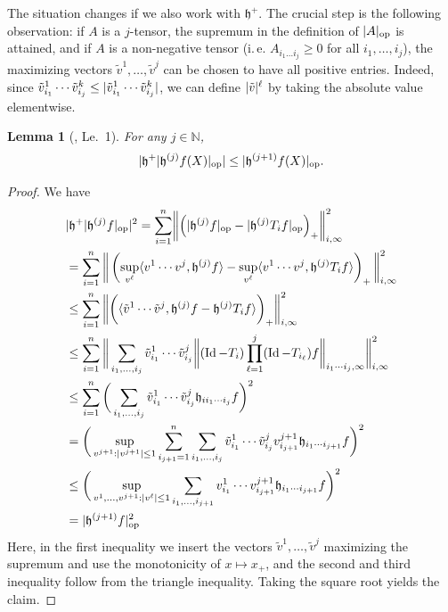 \documentclass[a4paper,12pt]{amsart}
\numberwithin{equation}{section}
\newtheorem{lemma}[satz]{Lemma}
\theoremstyle{remark}
\DeclarePairedDelimiter	{\abs}		{\lvert}	{\rvert}
\DeclarePairedDelimiter	{\norm}		{\lVert}	{\rVert}
\DeclarePairedDelimiter	{\skal}		{\langle}	{\rangle}
\DeclareMathOperator	{\Id}		{Id}
\newcommand				{\bnorm}[1]	{\bigg\lVert #1 \bigg\rVert}
\def\N{{\mathbb N}}
\begin{document}
The situation changes if we also work with $\mathfrak{h}^+$. The crucial step is the following observation: if $A$ is a $j$-tensor, the supremum in the definition of $\abs{A}_\mathrm{op}$ is attained, and if $A$ is a non-negative tensor (i.\,e. $A_{i_1 \ldots i_j} \ge 0$ for all $i_1, \ldots, i_j$), the maximizing vectors $\tilde{v}^1, \ldots, \tilde{v}^j$ can be chosen to have all positive entries. Indeed, since $\tilde{v}^1_{i_1} \cdots \tilde{v}^k_{i_j} \le \abs{\tilde{v}^1_{i_1} \cdots \tilde{v}^k_{i_j}}$, we can define $\abs{\tilde{v}}^\ell$ by taking the absolute value elementwise.

\begin{lemma}[\cite{GSS21a}, Le.\ 1]		\label{lem:recursiveEstimateOperatorNorms}
	For any $j \in \N$,
	\[
	\abs{\mathfrak{h}^+ \abs{\mathfrak{h}^{(j)} f(X)}_\mathrm{op}} \le \abs{\mathfrak{h}^{(j+1)} f(X)}_\mathrm{op}.
	\]
\end{lemma}

\begin{proof}
	We have
	\begin{align*}
		&\abs{\mathfrak{h}^+ \abs{\mathfrak{h}^{(j)} f}_\mathrm{op}}^2 = \sum_{i= 1}^n \norm*{\left( \abs{\mathfrak{h}^{(j)} f}_\mathrm{op} - \abs{\mathfrak{h}^{(j)} T_i f}_\mathrm{op} \right)_+}_{i,\infty}^2 \\
		&= \sum_{i=1}^n \bnorm{\left( \sup_{v^\ell} \skal{v^1 \cdots v^j, \mathfrak{h}^{(j)}f} - \sup_{v^\ell} \skal{v^1 \cdots v^j, \mathfrak{h}^{(j)}T_i f} \right)_+}_{i,\infty}^2 \\
		&\le \sum_{i = 1}^n \bnorm{\bigg(\skal{\tilde{v}^1\cdots \tilde{v}^j, \mathfrak{h}^{(j)}f - \mathfrak{h}^{(j)} T_i f} \bigg)_+}_{i,\infty}^2 \\
		&\le \sum_{i = 1}^n \bnorm{\sum_{i_1,\ldots,i_j} \tilde{v}^1_{i_1} \cdots \tilde{v}^j_{i_j} \bnorm{(\Id - T_i) \prod_{\ell = 1}^j (\Id - T_{i_\ell})f}_{i_1 \cdots i_j,\infty} }_{i,\infty}^2 \\
		&\le \sum_{i =1}^n \bigg( \sum_{i_1, \ldots, i_j} \tilde{v}^1_{i_1} \cdots \tilde{v}^j_{i_j} \mathfrak{h}_{i i_1 \cdots i_j}f \bigg)^2 \\
		&= \bigg( \sup_{v^{j+1} : \abs{v^{j+1}} \le 1} \sum_{i_{j+1}=1}^n \sum_{i_1, \ldots, i_j} \tilde{v}_{i_1}^1 \cdots \tilde{v}^j_{i_j} v^{j+1}_{i_{j+1}} \mathfrak{h}_{i_1 \cdots i_{j+1}} f \bigg)^2 \\
		&\le \bigg( \sup_{v^1, \ldots, v^{j+1} : \abs{v^\ell} \le 1} \sum_{i_1, \ldots, i_{j+1}} v_{i_1}^1 \cdots v_{i_{j+1}}^{j+1} \mathfrak{h}_{i_1 \cdots i_{j+1}}f \bigg)^2 \\
		&= \abs{\mathfrak{h}^{(j+1)}f}_\mathrm{op}^2
	\end{align*}
	Here, in the first inequality we insert the vectors $\tilde{v}^1, \ldots, \tilde{v}^j$ maximizing the supremum and use the monotonicity of $x \mapsto x_+$, and the second and third inequality follow from the triangle inequality. Taking the square root yields the claim.
\end{proof}
\end{document}

